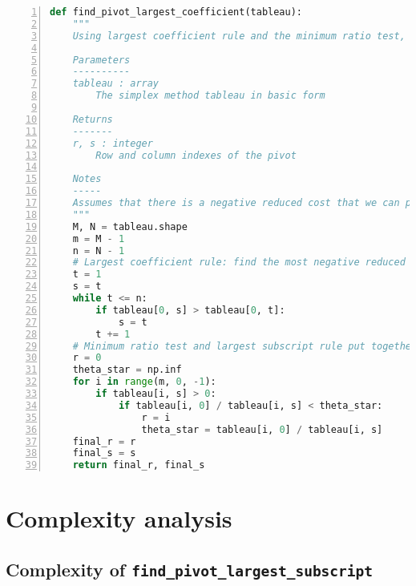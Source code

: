 \documentclass[a4paper]{article}
\numberwithin{equation}{section}
\begin{document}
\begin{lstlisting}[language=Python,numbers=left,numbersep=5pt, breaklines=true]
  def find_pivot_largest_coefficient(tableau):
    """
    Using largest coefficient rule and the minimum ratio test, find the pivot entry in the tableau.

    Parameters
    ----------
    tableau : array
        The simplex method tableau in basic form

    Returns
    -------
    r, s : integer
        Row and column indexes of the pivot

    Notes
    -----
    Assumes that there is a negative reduced cost that we can pivot on.
    """
    M, N = tableau.shape
    m = M - 1
    n = N - 1
    # Largest coefficient rule: find the most negative reduced cost
    t = 1
    s = t
    while t <= n:
        if tableau[0, s] > tableau[0, t]:
            s = t
        t += 1
    # Minimum ratio test and largest subscript rule put together:
    r = 0
    theta_star = np.inf
    for i in range(m, 0, -1):
        if tableau[i, s] > 0:
            if tableau[i, 0] / tableau[i, s] < theta_star:
                r = i
                theta_star = tableau[i, 0] / tableau[i, s]
    final_r = r
    final_s = s
    return final_r, final_s
\end{lstlisting}
  

\section{Complexity analysis}
\label{sec:complexity}

\subsection{Complexity of  \texttt{find\_pivot\_largest\_subscript}}
\label{sec:complexity_ls}
\end{document}
